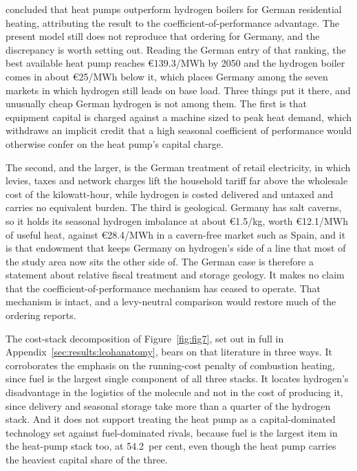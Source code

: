 \citet{Huckebrink2022} concluded that heat pumps outperform hydrogen boilers for German
residential heating, attributing the result to the coefficient-of-performance advantage.
The present model still does not reproduce that ordering for Germany, and the
discrepancy is worth setting out. Reading the German entry of that ranking, the best
available heat pump reaches \euro{}139.3/MWh by 2050 and the hydrogen boiler comes in
about \euro{}25/MWh below it, which places Germany among the seven markets in which
hydrogen still leads on base load. Three things put it there, and unusually cheap German
hydrogen is not among them. The first is that equipment capital is charged against a
machine sized to peak heat demand, which withdraws an implicit credit that a high
seasonal coefficient of performance would otherwise confer on the heat pump's capital
charge.

The second, and the larger, is the German treatment of retail electricity, in which
levies, taxes and network charges lift the household tariff far above the wholesale cost
of the kilowatt-hour, while hydrogen is costed delivered and untaxed and carries no
equivalent burden. The third is geological. Germany has salt caverns, so it holds its
seasonal hydrogen imbalance at about \euro{}1.5/kg, worth \euro{}12.1/MWh of useful
heat, against \euro{}28.4/MWh in a cavern-free market such as Spain, and it is that
endowment that keeps Germany on hydrogen's side of a line that most of the study area
now sits the other side of. The German case is therefore a statement about relative
fiscal treatment and storage geology. It makes no claim that the
coefficient-of-performance mechanism has ceased to operate. That mechanism is intact, and a levy-neutral comparison
would restore much of the ordering \citet{Huckebrink2022} reports.

The cost-stack decomposition of Figure~\ref{fig:fig7}, set out in full in
Appendix~\ref{sec:results:lcohanatomy}, bears on that literature in three ways. It
corroborates the emphasis on the running-cost penalty of combustion heating, since fuel
is the largest single component of all three stacks. It locates hydrogen's disadvantage
in the logistics of the molecule and not in the cost of producing it, since delivery and
seasonal storage take more than a quarter of the hydrogen stack. And it does not support
treating the heat pump as a capital-dominated technology set against fuel-dominated
rivals, because fuel is the largest item in the heat-pump stack too, at 54.2~per cent,
even though the heat pump carries the heaviest capital share of the three.

